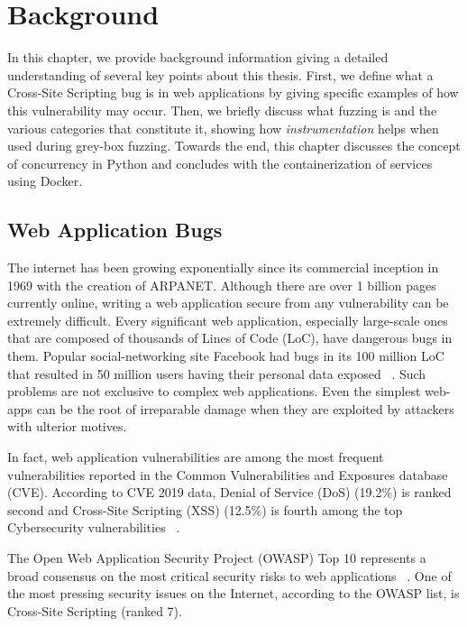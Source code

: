 \chapter{Background}
\label{sec:background}
\minitoc
\vspace*{1cm}

In this chapter, we provide background information giving a detailed understanding of several key points about this thesis. First, we define what a Cross-Site Scripting bug is in web applications by giving specific examples of how this vulnerability may occur. Then, we briefly discuss what fuzzing is and the various categories that constitute it, showing how \emph{instrumentation} helps when used during grey-box fuzzing. Towards the end, this chapter discusses the concept of concurrency in Python and concludes with the containerization of services using Docker.

\section{Web Application Bugs}
The internet has been growing exponentially since its commercial inception in 1969 with the creation of ARPANET. Although there are over 1 billion pages currently online, writing a web application secure from any vulnerability can be extremely difficult. Every significant web application, especially large-scale ones that are composed of thousands of Lines of Code (LoC), have dangerous bugs in them. Popular social-networking site Facebook had bugs in its 100 million LoC that resulted in 50 million users having their personal data exposed ~\cite{facebook_data_breach,facebook_loc}. Such problems are not exclusive to complex web applications. Even the simplest web-apps can be the root of irreparable damage when they are exploited by attackers with ulterior motives. 

In fact, web application vulnerabilities are among the most frequent vulnerabilities reported in the Common Vulnerabilities and Exposures database (CVE). According to CVE 2019 data, Denial of Service  (DoS) (19.2\%) is ranked second and Cross-Site Scripting (XSS) (12.5\%) is fourth among the top Cybersecurity vulnerabilities ~\cite{cve}.

The Open Web Application Security Project (OWASP) Top 10 represents a broad consensus on the most critical security risks to web applications ~\cite{owasp2017}. One of the most pressing security issues on the Internet, according to the OWASP list, is Cross-Site Scripting (ranked 7).

